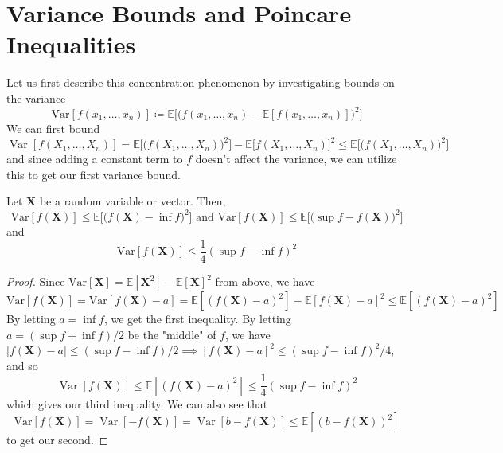 \documentclass{article}
\DeclareMathOperator{\Var}{Var}
\begin{document}
\pagebreak 

\section{Variance Bounds and Poincare Inequalities}

Let us first describe this concentration phenomenon by investigating bounds on the variance 
\[\mathrm{Var}[f(x_1, \ldots, x_n)] \coloneqq \mathbb{E}\big[ \big( f(x_1, \ldots, x_n) - \mathbb{E}[f(x_1, \ldots, x_n)] \big)^2 \big] \]
We can first bound 
\[\Var[f(X_1, \ldots, X_n)] = \mathbb{E}\big[ \big( f(X_1, \ldots, X_n)\big)^2 \big] - \mathbb{E}\big[ f(X_1, \ldots, X_n) \big]^2 \leq \mathbb{E}\big[ \big( f(X_1, \ldots, X_n)\big)^2 \big]\]
and since adding a constant term to $f$ doesn't affect the variance, we can utilize this to get our first variance bound. 

\begin{lemma}
Let $\mathbf{X}$ be a random variable or vector. Then, 
\[\mathrm{Var}[f(\mathbf{X})] \leq \mathbb{E} \big[ \big( f(\mathbf{X}) - \inf f \big)^2 \big] \text{ and } \mathrm{Var}[f(\mathbf{X})] \leq \mathbb{E} \big[ \big(\sup f - f(\mathbf{X}) \big)^2 \big]\]
and 
\[\mathrm{Var}[ f(\mathbf{X})] \leq \frac{1}{4} ( \sup f - \inf f)^2\]
\end{lemma}
\begin{proof} 
Since $\mathrm{Var}[\mathbf{X}] = \mathbb{E}[\mathbf{X}^2] - \mathbb{E}[\mathbf{X}]^2$ from above, we have 
\[\mathrm{Var}[ f(\mathbf{X})] = \mathrm{Var}[f(\mathbf{X}) - a] = \mathbb{E}[(f(\mathbf{X}) - a)^2] - \mathbb{E}[f(\mathbf{X}) - a]^2 \leq \mathbb{E}[(f(\mathbf{X}) - a)^2]\]
By letting $a = \inf f$, we get the first inequality. By letting $a = (\sup f + \inf f) /2$ be the "middle" of $f$, we have $|f(\mathbf{X}) - a| \leq (\sup f - \inf f)/2 \implies [f(\mathbf{X}) - a]^2 \leq (\sup f - \inf f)^2/4$, and so 
\[\Var[ f(\mathbf{X})] \leq \mathbb{E}[(f(\mathbf{X}) - a)^2] \leq \frac{1}{4} (\sup f - \inf f)^2\]
which gives our third inequality. We can also see that 
\[\mathrm{Var}[ f(\mathbf{X})] = \Var[ -f (\mathbf{X})] = \Var[ b - f(\mathbf{X})] \leq \mathbb{E}[ (b - f(\mathbf{X}))^2]\]
to get our second. 
\end{proof} 
\end{document}
